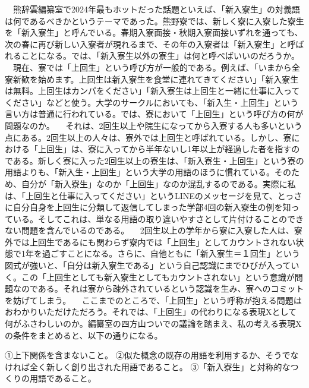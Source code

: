 　熊辞雲編纂室で2024年最もホットだった話題といえば、「新入寮生」の対義語は何であるべきかというテーマであった。熊野寮では、新しく寮に入寮した寮生を「新入寮生」と呼んでいる。春期入寮面接・秋期入寮面接いずれを通っても、次の春に再び新しい入寮者が現れるまで、その年の入寮者は「新入寮生」と呼ばれることになる。では、「新入寮生以外の寮生」は何と呼べばいいのだろうか。
　現在、寮では「上回生」という呼び方が一般的である。例えば、「いまから全寮新歓を始めます。上回生は新入寮生を食堂に連れてきてください」「新入寮生は無料。上回生はカンパをください」「新入寮生は上回生と一緒に仕事に入ってください」などと使う。大学のサークルにおいても、「新入生・上回生」という言い方は普通に行われている。では、寮において「上回生」という呼び方の何が問題なのか。
　それは、2回生以上や院生になってから入寮する人も多いという点にある。2回生以上の人々は、寮外では上回生と呼ばれている。しかし、寮における「上回生」は、寮に入ってから半年ないし1年以上が経過した者を指すのである。新しく寮に入った2回生以上の寮生は、「新入寮生・上回生」という寮の用語よりも、「新入生・上回生」という大学の用語のほうに慣れている。そのため、自分が「新入寮生」なのか「上回生」なのか混乱するのである。実際に私は、「上回生と仕事に入ってください」というLINEのメッセージを見て、とっさに自分自身を上回生に分類して返信してしまった学部4回の新入寮生の例を知っている。そしてこれは、単なる用語の取り違いやすさとして片付けることのできない問題を含んでいるのである。
　2回生以上の学年から寮に入寮した人は、寮外では上回生であるにも関わらず寮内では「上回生」としてカウントされない状態で1年を過ごすことになる。さらに、自他ともに「新入寮生＝１回生」という図式が強いと、「自分は新入寮生である」という自己認識にまでひびが入っていく。この「上回生としても新入寮生としてもカウントされない」という意識が問題なのである。それは寮から疎外されているという認識を生み、寮へのコミットを妨げてしまう。
　ここまでのところで、「上回生」という呼称が抱える問題はおわかりいただけただろう。それでは、「上回生」の代わりになる表現Xとして何がふさわしいのか。編纂室の四方山ついでの議論を踏まえ、私の考える表現Xの条件をまとめると、以下の通りになる。
 
①上下関係を含まないこと。
②似た概念の既存の用語を利用するか、そうでなければ全く新しく創り出された用語であること。
③「新入寮生」と対称的なつくりの用語であること。
 
